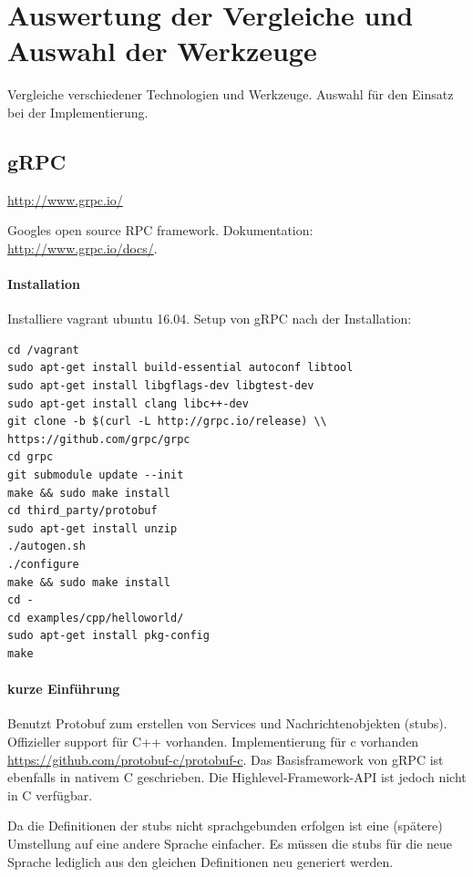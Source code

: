 \documentclass[a4paper,10pt]{article}
\numberwithin{figure}{section}
\numberwithin{table}{section}
\begin{document}
\section{Auswertung der Vergleiche und Auswahl der Werkzeuge}

Vergleiche verschiedener Technologien und Werkzeuge.
Auswahl für den Einsatz bei der Implementierung.

\subsection{gRPC} \url{http://www.grpc.io/}

Googles open source RPC framework.
Dokumentation: \url{http://www.grpc.io/docs/}.

\paragraph{Installation}

Installiere vagrant ubuntu 16.04.
Setup von gRPC nach der Installation:

\begin{lstlisting}[frame=single,caption=Installiere vagrant ubuntu 16.04, breaklines=true]
cd /vagrant
sudo apt-get install build-essential autoconf libtool
sudo apt-get install libgflags-dev libgtest-dev
sudo apt-get install clang libc++-dev
git clone -b $(curl -L http://grpc.io/release) \\
https://github.com/grpc/grpc
cd grpc
git submodule update --init
make && sudo make install
cd third_party/protobuf
sudo apt-get install unzip
./autogen.sh
./configure
make && sudo make install
cd -
cd examples/cpp/helloworld/
sudo apt-get install pkg-config
make
\end{lstlisting}

\paragraph{kurze Einführung}


Benutzt Protobuf zum erstellen von Services und Nachrichtenobjekten (stubs).
Offizieller support für C++ vorhanden.
Implementierung für c vorhanden \url{https://github.com/protobuf-c/protobuf-c}.
Das Basisframework von gRPC ist ebenfalls in nativem C geschrieben.
Die Highlevel-Framework-API ist jedoch nicht in C verfügbar.

Da die Definitionen der stubs nicht sprachgebunden erfolgen ist eine (spätere) Umstellung auf eine andere Sprache einfacher.
Es müssen die stubs für die neue Sprache lediglich aus den gleichen Definitionen neu generiert werden.
\end{document}
